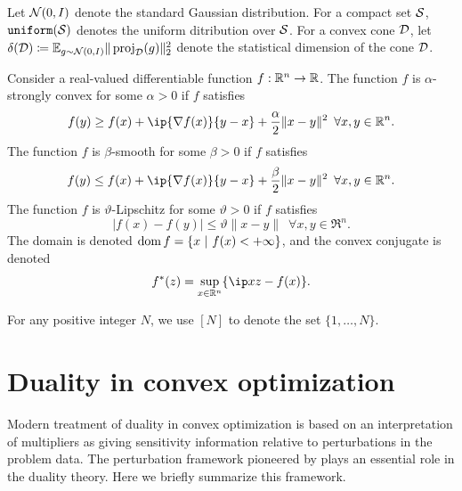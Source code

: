 Let $\mathcal{N}(0,I)$ denote the standard Gaussian distribution. For a compact set $\mathcal{S}$, $\operatorname{\texttt{uniform}}(\mathcal{S})$ denotes the uniform ditribution over $\mathcal{S}$. For a convex cone $\mathcal{D}$, let $\delta(\mathcal{D}) \coloneqq \mathbb{E}_{g\sim\mathcal{N}(0,I)} \|\operatorname{proj}_{\mathcal{D}}(g)\|_2^2 $ denote the statistical dimension of the cone $\mathcal{D}$.

Consider a real-valued differentiable function $f:\mathbb{R}^n\to\mathbb{R}$. The function $f$ is $\alpha$-strongly convex for some $\alpha>0$ if $f$ satisfies
\[f(y) \geq f(x) + \ip{\nabla f(x)}{y-x} + \frac{\alpha}{2}\|x-y\|^2 \enspace \forall x, y \in \Re^n.\]
The function $f$ is $\beta$-smooth for some $\beta>0$ if $f$ satisfies
\[f(y) \leq f(x) + \ip{\nabla f(x)}{y-x} + \frac{\beta}{2}\|x-y\|^2 \enspace \forall x, y \in \Re^n.\]
The function $f$ is $\vartheta$-Lipschitz for some $\vartheta>0$ if $f$ satisfies
\[|f(x) - f(y)| \leq \vartheta\|x-y\| \enspace \forall x, y \in \Re^n.\]
The domain is denoted
$\operatorname{dom} f = \{x~|~f(x)<+\infty\}$, and the convex conjugate is denoted
\[
  f^*(z) = \sup_{x\in\Re^n}\{\ip x z - f(x) \}.
\] 

For any positive integer $N$, we use $[N]$ to denote the set $\{1, \dots, N\}$. 


\section{Duality in convex optimization} \label{sec:1-2}

Modern treatment of duality in convex optimization is based on an interpretation of multipliers as giving sensitivity information relative to perturbations in the problem data. The perturbation framework pioneered by \citet{rockafellar1970convex} plays an essential role in the duality theory. Here we briefly summarize this framework. 

